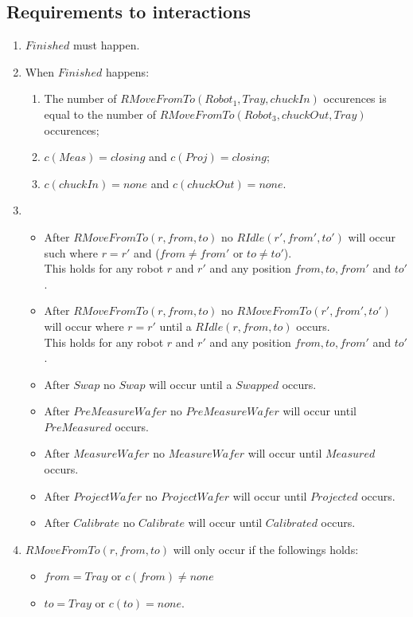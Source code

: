 \subsection{Requirements to interactions}

\begin{enumerate}
	\item $Finished$ must happen.
	\item When $Finished$ happens:
	\begin{enumerate}
	\item The number of $RMoveFromTo(Robot_1, Tray, chuckIn)$ occurences is equal to the number of $RMoveFromTo(Robot_3, chuckOut, Tray)$ occurences;
	\item $c(Meas) = closing$ and $c(Proj) = closing$;
	\item $c(chuckIn) = none$ and $c(chuckOut) = none$.
	\end{enumerate}
	\item 
		\begin{itemize}
			\item After $RMoveFromTo(r, from, to)$ no $RIdle(r', from', to')$ will occur such where $r=r'$ and ($from \neq from'$ or $to \neq to'$).\\This holds for any robot $r$ and $r'$ and any position $from, to, from'$ and $to'$.
			\item After $RMoveFromTo(r, from, to)$ no $RMoveFromTo(r', from', to')$ will occur where $r=r'$ until a $RIdle(r, from, to)$ occurs. \\This holds for any robot $r$ and $r'$ and any position $from, to, from'$ and $to'$.
			\item After $Swap$ no $Swap$ will occur until a $Swapped$ occurs.
			\item After $PreMeasureWafer$ no $PreMeasureWafer$ will occur until $PreMeasured$ occurs.
			\item After $MeasureWafer$ no $MeasureWafer$ will occur until $Measured$ occurs.
			\item After $ProjectWafer$ no $ProjectWafer$ will occur until $Projected$ occurs.
			\item After $Calibrate$ no $Calibrate$ will occur until $Calibrated$ occurs.
		\end{itemize}
	\item $RMoveFromTo(r, from, to)$ will only occur if the followings holds:
	\begin{itemize}
	\item $from = Tray$ or $c(from) \neq none$
	\item $to = Tray$ or $c(to) = none$.

\end{itemize}
\end{enumerate}

